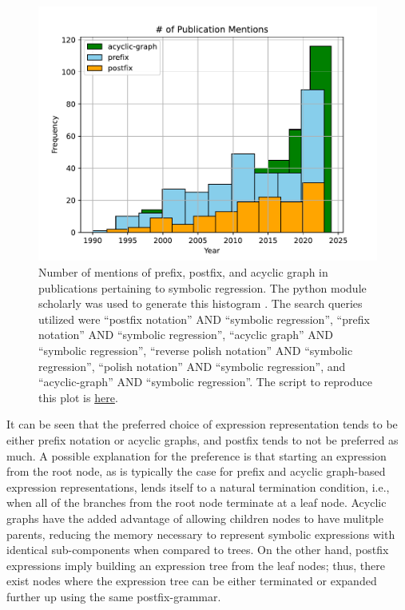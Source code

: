 \documentclass[12pt]{iopart}
\begin{document}
\begin{figure}
    \centering
    \includegraphics[width=\linewidth]{pub_freqs.pdf}
    \caption{Number of mentions of prefix, postfix, and acyclic graph in publications pertaining to symbolic regression. The python module scholarly was used to generate this histogram \cite{cholewiak2021scholarly}. The search queries utilized were ``postfix notation'' AND ``symbolic regression'', ``prefix notation'' AND ``symbolic regression'', ``acyclic graph'' AND ``symbolic regression'', ``reverse polish notation'' AND ``symbolic regression'', ``polish notation'' AND ``symbolic regression'', and ``acyclic-graph'' AND ``symbolic regression''. The script to reproduce this plot is \href{https://github.com/edfink234/Alpha-Zero-Symbolic-Regression/blob/2999916868007841f05c272498edef3aa2dcb494/Figure_1/notations_pubs_counter.py}{here}.} 
    \label{fig:pub_freqs_pre_post_acyc_graph}
\end{figure}

It can be seen that the preferred choice of expression representation tends to be either prefix notation or acyclic graphs, and postfix tends to not be preferred as much. A possible explanation for the preference is that starting an expression from the root node, as is typically the case for prefix and acyclic graph-based expression representations, lends itself to a natural termination condition, i.e., when all of the branches from the root node terminate at a leaf node. Acyclic graphs have the added advantage of allowing children nodes to have mulitple parents, reducing the memory necessary to represent symbolic expressions with identical sub-components when compared to trees. On the other hand, postfix expressions imply building an expression tree from the leaf nodes; thus, there exist nodes where the expression tree can be either terminated or expanded further up using the same postfix-grammar. 
\end{document}
